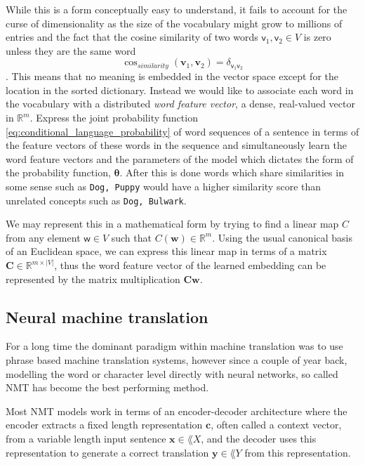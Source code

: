 While this is a form conceptually easy to understand, it fails to account for the
curse of dimensionality as the size of the vocabulary might grow to millions of
entries and the fact that the cosine similarity of two words $\mathsf{v}_1,
\mathsf{v}_2 \in V$ is zero unless they are the same word
\begin{equation}
  \label{eq:cosine_similarity}
  \cos_{similarity}(\bm{v}_1, \bm{v}_2) = \delta_{\mathsf{v}_1 \mathsf{v}_2}
\end{equation}. This means that no meaning is embedded in the vector space
except for the location in the sorted dictionary. Instead we would like to
associate each word in the vocabulary with a distributed \textit{word feature
  vector}, a dense, real-valued vector in $\mathbb{R}^m$. Express the joint probability
function \eqref{eq:conditional_language_probability} of word sequences of a
sentence in terms of the feature vectors of these words in the sequence and
simultaneously learn the word feature vectors and the parameters of the model
which dictates the form of the probability function, $\bm{\theta}$. After this
is done words which share similarities in some sense such as \texttt{Dog, Puppy}
would have a higher similarity score than unrelated concepts such as \texttt{Dog, Bulwark}\cite{Bengio:2003:NPL:944919.944966}.

We may represent this in a mathematical form by trying to find a linear map $C$
from any element $\mathsf{w} \in V$ such that $C(\mathbf{w}) \in \mathbb{R}^m$.
Using the usual canonical basis of an Euclidean space, we can express this
linear map in terms of a matrix $\bm{C} \in \mathbb{R}^{m \times |V|}$, thus the
word feature vector of the learned embedding can be represented by the matrix
multiplication $\bm{C}\bm{w}$.

\subsection{Neural machine translation}
For a long time the dominant paradigm within machine translation was to use
phrase based machine translation systems\cite{Koehn:2003:SPT:1073445.1073462,
  Koehn:2007:MOS:1557769.1557821}, however since a couple of year back,
modelling the word or character level directly with neural networks, so called
NMT has become the best performing method\cite{wolk_neural-based_2015, wu_googles_2016}.

Most NMT models work in terms of an encoder-decoder architecture where the
encoder extracts a fixed length representation $\bm{c}$, often called a context
vector, from a variable length input sentence $\bm{x} \in \lang{X}$, and the
decoder uses this representation to generate a correct translation $\bm{y} \in
\lang{Y}$ from this representation\cite{cho_properties_2014}.

